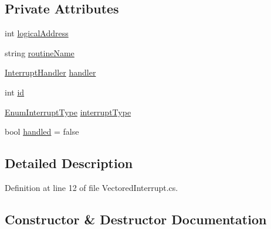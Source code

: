 \subsection*{Private Attributes}
\begin{DoxyCompactItemize}
\item 
int \hyperlink{class_c_p_u___o_s___simulator_1_1_c_p_u_1_1_interrupts_1_1_vectored_interrupt_ad59ab75bdd99d70caa63d5ac36b532e8}{logical\+Address}
\item 
string \hyperlink{class_c_p_u___o_s___simulator_1_1_c_p_u_1_1_interrupts_1_1_vectored_interrupt_a8f7cd5a533089f96fdc12a97c083a7fe}{routine\+Name}
\item 
\hyperlink{class_c_p_u___o_s___simulator_1_1_c_p_u_1_1_interrupts_1_1_interrupt_handler}{Interrupt\+Handler} \hyperlink{class_c_p_u___o_s___simulator_1_1_c_p_u_1_1_interrupts_1_1_vectored_interrupt_a13e9b0f3b6f66f67fa510bd9930b3765}{handler}
\item 
int \hyperlink{class_c_p_u___o_s___simulator_1_1_c_p_u_1_1_interrupts_1_1_vectored_interrupt_a799d7985bc1cc6626ee8a39a41897630}{id}
\item 
\hyperlink{namespace_c_p_u___o_s___simulator_1_1_c_p_u_1_1_interrupts_a575a43213ed6d54083da8956c5a69b39}{Enum\+Interrupt\+Type} \hyperlink{class_c_p_u___o_s___simulator_1_1_c_p_u_1_1_interrupts_1_1_vectored_interrupt_aecc5431f2893b3a30ff4caae5afbf89b}{interrupt\+Type}
\item 
bool \hyperlink{class_c_p_u___o_s___simulator_1_1_c_p_u_1_1_interrupts_1_1_vectored_interrupt_a12c7df81f02d946f6febbc38240a6460}{handled} = false
\end{DoxyCompactItemize}


\subsection{Detailed Description}


Definition at line 12 of file Vectored\+Interrupt.\+cs.



\subsection{Constructor \& Destructor Documentation}
\hypertarget{class_c_p_u___o_s___simulator_1_1_c_p_u_1_1_interrupts_1_1_vectored_interrupt_ab0a936425c3af22d7626b5c5638d3f71}{}

